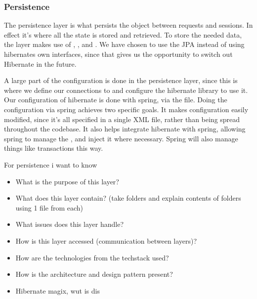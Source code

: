\subsubsection{Persistence}
The persistence layer is what persists the object between requests and
sessions. In effect it's where all the state is stored and retrieved. To store
the needed data, the layer makes use of ,
, and . We have chosen to use the JPA
instead of using hibernates own interfaces, since that gives us the opportunity
to switch out Hibernate in the future.

A large part of the configuration is done in the persistence layer, since this
is where we define our connections to  and configure the hibernate
library to use it. Our configuration of hibernate is done with spring, via the
 file. Doing the configuration via spring achieves
two specific goals. It makes configuration easily modified, since it's all
specified in a single XML file, rather than being spread throughout the
codebase. It also helps integrate hibernate with spring, allowing spring to
manage the , and inject it where necessary. Spring will also
manage things like transactions this way.

For persistence i want to know
\begin{itemize}
    \item What is the purpose of this layer?
    \item What does this layer contain? (take folders and explain contents of folders using 1 file from each)
    \item What issues does this layer handle?
    \item How is this layer accessed (communication between layers)?
    \item How are the technologies from the techstack used?
    \item How is the architecture and design pattern present?
    \item Hibernate magix, wut is dis
\end{itemize}
